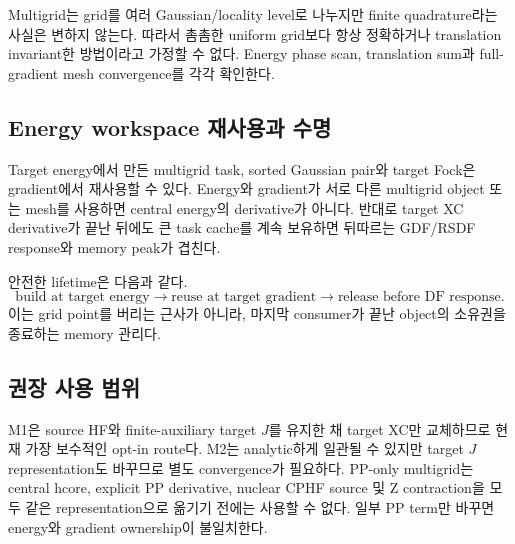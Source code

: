 Multigrid는 grid를 여러 Gaussian/locality level로 나누지만 finite quadrature라는 사실은
변하지 않는다. 따라서 촘촘한 uniform grid보다 항상 정확하거나 translation invariant한
방법이라고 가정할 수 없다. Energy phase scan, translation sum과 full-gradient mesh
convergence를 각각 확인한다.

\subsection{Energy workspace 재사용과 수명}

Target energy에서 만든 multigrid task, sorted Gaussian pair와 target Fock은 gradient에서
재사용할 수 있다. Energy와 gradient가 서로 다른 multigrid object 또는 mesh를 사용하면
central energy의 derivative가 아니다. 반대로 target XC derivative가 끝난 뒤에도 큰 task
cache를 계속 보유하면 뒤따르는 GDF/RSDF response와 memory peak가 겹친다.

안전한 lifetime은 다음과 같다.
\begin{equation}
  \text{build at target energy}
  \longrightarrow
  \text{reuse at target gradient}
  \longrightarrow
  \text{release before DF response}.
  \label{eq:target-multigrid-memory}
\end{equation}
이는 grid point를 버리는 근사가 아니라, 마지막 consumer가 끝난 object의 소유권을
종료하는 memory 관리다.

\subsection{권장 사용 범위}

M1은 source HF와 finite-auxiliary target $J$를 유지한 채 target XC만 교체하므로 현재
가장 보수적인 opt-in route다. M2는 analytic하게 일관될 수 있지만 target $J$
representation도 바꾸므로 별도 convergence가 필요하다. PP-only multigrid는 central
hcore, explicit PP derivative, nuclear CPHF source 및 Z contraction을 모두 같은
representation으로 옮기기 전에는 사용할 수 없다. 일부 PP term만 바꾸면 energy와
gradient ownership이 불일치한다.
